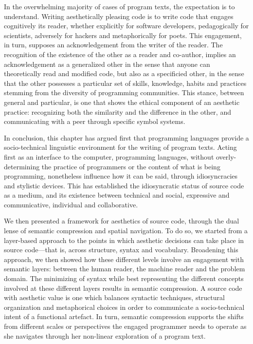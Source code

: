 In the overwhelming majority of cases of program texts, the expectation is to understand. Writing aesthetically pleasing code is to write code that engages cognitively its reader, whether explicitly for software developers, pedagogically for scientists, adversely for hackers and metaphorically for poets. This engagement, in turn, supposes an acknowledgement from the writer of the reader. The recognition of the existence of the other as a reader and co-author, implies an acknowledgement as a generalized other in the sense that anyone can theoretically read and modified code, but also as a specificied other, in the sense that the other possesses a particular set of skills, knowledge, habits and practices stemming from the diversity of programming communities. This stance, between general and particular, is one that shows the ethical component of an aesthetic practice: recognizing both the similarity and the difference in the other, and communicating with a peer through specific symbol systems.

\spacer

In conclusion, this chapter has argued first that programming languages provide a socio-technical linguistic environment for the writing of program texts. Acting first as an interface to the computer, programming languages, without overly-determining the practice of programmers or the content of what is being programming, nonetheless influence how it can be said, through idiosyncracies and stylistic devices. This has established the idiosyncratic status of source code as a medium, and its existence between technical and social, expressive and communicative, individual and collaborative.

We then presented a framework for aesthetics of source code, through the dual lense of semantic compression and spatial navigation. To do so, we started from a layer-based approach to the points in which aesthetic decisions can take place in source code—that is, across structure, syntax and vocabulary. Broadening this approach, we then showed how these different levels involve an engagement with semantic layers: between the human reader, the machine reader and the problem domain. The minimizing of syntax while best representing the different concepts involved at these different layers results in semantic compression. A source code with aesthetic value is one which balances syntactic techniques, structural organization and metaphorical choices in order to communicate a socio-technical intent of a functional artefact. In turn, semantic compression supports the shifts from different scales or perspectives the engaged programmer needs to operate as she navigates through her non-linear exploration of a program text.

